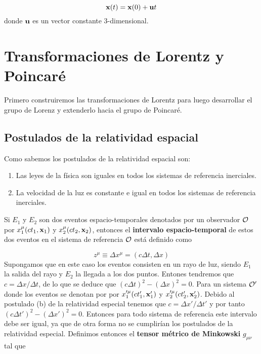 \begin{equation}
	\mathbf{x}(t) = \mathbf{x}(0)+ \mathbf{u} t
\end{equation}
donde $\mathbf{u}$ es un vector constante 3-dimensional.

\section{Transformaciones de Lorentz y Poincaré}

Primero construiremos las transformaciones de Lorentz para luego desarrollar el grupo de Lorenz y extenderlo hacia el grupo de Poincaré.

\subsection{Postulados de la relatividad espacial}

Como sabemos los postulados de la relatividad espacial son:

\begin{enumerate}[label*=\alph*)]
	\item Las leyes de la física son iguales en todos los sistemas de referencia inerciales.
	\item La velocidad de la luz es constante e igual en todos los sistemas de referencia inerciales.
\end{enumerate}
Si $E_1$ y $E_2$ son dos eventos espacio-temporales denotados por un observador $\mathcal{O}$ por $x_ 1^\mu(ct_1,\mathbf{x}_1)$ y $x_2^\mu(ct_2,\mathbf{x}_2)$, entonces el \textbf{intervalo espacio-temporal} de estos dos eventos en el sistema de referencia $\mathcal{O}$ está definido como

\begin{equation}
	z^\mu \equiv \Delta x^\mu = (c\Delta t,\Delta x)
\end{equation}
Supongamos que en este caso los eventos consisten en un rayo de luz, siendo $E_1$ la salida del rayo y $E_2$ la llegada a los dos puntos. Entones tendremos que $c=\Delta x/\Delta t$, de lo que se deduce que $(c\Delta t)^2 - (\Delta x)^2 = 0$. Para un sistema $\mathcal{O}'$  donde los eventos se denotan por por $x_1'^\mu(ct_1',\mathbf{x}_1')$ y $x_2'^\mu(ct_2',\mathbf{x}_2')$. Debido al postulado (b) de la relatividad especial tenemos que $c=\Delta x' / \Delta t'$ y por tanto $(c\Delta t')^2 - (\Delta x')^2 = 0$. Entonces para todo sistema de referencia este intervalo debe ser igual, ya que de otra forma no se cumplirían los postulados de la relatividad especial. Definimos entonces el \textbf{tensor métrico de Minkowski} $g_{\mu \nu}$ tal que


